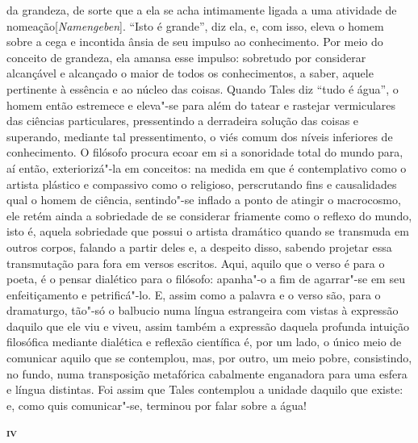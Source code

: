  da grandeza, de sorte que a ela se acha intimamente ligada a uma atividade
 de nomeação[\textit{Namengeben}]. ``Isto é grande'', diz ela, e, com isso,
 eleva o homem sobre a cega e incontida ânsia de seu impulso ao conhecimento.
 Por meio do conceito de grandeza, ela amansa esse impulso: sobretudo por
 considerar alcançável e alcançado o maior de todos os conhecimentos, a
 saber, aquele pertinente à essência e ao núcleo das coisas. Quando Tales diz
 ``tudo é água'', o homem então estremece e eleva"-se para além do tatear e
 rastejar vermiculares das ciências particulares, pressentindo a derradeira
 solução das coisas e superando, mediante tal pressentimento, o viés comum
 dos níveis inferiores de conhecimento. O filósofo procura ecoar em si a
 sonoridade total do mundo para, aí então, exteriorizá"-la em conceitos: na
 medida em que é contemplativo como o artista plástico e compassivo como o
 religioso, perscrutando fins e causalidades qual o homem de ciência,
 sentindo"-se inflado a ponto de atingir o macrocosmo, ele retém ainda a
 sobriedade de se considerar friamente como o reflexo do mundo, isto é,
 aquela sobriedade que possui o artista dramático quando se transmuda em
 outros corpos, falando a partir deles e, a despeito disso, sabendo projetar
 essa transmutação para fora em versos escritos. Aqui, aquilo que o verso é
 para o poeta, é o pensar dialético para o filósofo: apanha"-o a fim de
 agarrar"-se em seu enfeitiçamento e petrificá"-lo. E, assim como a palavra e
 o verso são, para o dramaturgo, tão"-só o balbucio numa língua estrangeira
 com vistas à expressão daquilo que ele viu e viveu, assim também a expressão
 daquela profunda intuição filosófica mediante dialética e reflexão
 científica é, por um lado, o único meio de comunicar aquilo que se
 contemplou, mas, por outro, um meio pobre, consistindo, no fundo, numa
 transposição metafórica cabalmente enganadora para uma esfera e língua
 distintas. Foi assim que Tales contemplou a unidade daquilo que existe: e,
 como quis comunicar"-se, terminou por falar sobre a água!

\bigskip
\textsc{\textbf{iv}}
\bigskip

